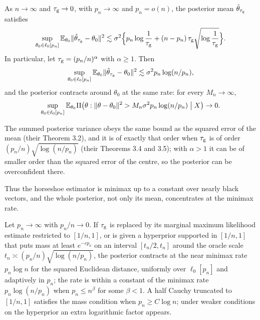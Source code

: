 \begin{theorem}\label{pg:thm:hs}
As $n\to\infty$ and $\tau_{\mathrm{g}}\to0$, with $p_n\to\infty$ and $p_n = o(n)$, the posterior mean $\hat\theta_{\tau_{\mathrm{g}}}$ satisfies
\[
\sup_{\theta_0\in\ell_0[p_n]}\mathbb{E}_{\theta_0}\lVert\hat\theta_{\tau_{\mathrm{g}}}-\theta_0\rVert^2 \lesssim \sigma^2\Bigl\{p_n\log\frac1{\tau_{\mathrm{g}}} + (n-p_n)\,\tau_{\mathrm{g}}\sqrt{\log\frac1{\tau_{\mathrm{g}}}}\Bigr\}.
\]
In particular, let $\tau_{\mathrm{g}} = (p_n/n)^\alpha$ with $\alpha\ge1$. Then
\[
\sup_{\theta_0\in\ell_0[p_n]}\mathbb{E}_{\theta_0}\lVert\hat\theta_{\tau_{\mathrm{g}}}-\theta_0\rVert^2 \lesssim \sigma^2 p_n\log(n/p_n),
\]
and the posterior contracts around $\theta_0$ at the same rate: for every $M_n\to\infty$,
\[
\sup_{\theta_0\in\ell_0[p_n]}\mathbb{E}_{\theta_0}\Pi\bigl(\theta:\lVert\theta-\theta_0\rVert^2 > M_n\sigma^2 p_n\log(n/p_n)\bigm| X\bigr)\to0 .
\]
\end{theorem}
The summed posterior variance obeys the same bound as the squared error of the mean (their Theorem 3.2), and it is of exactly that order when $\tau_{\mathrm{g}}$ is of order $(p_n/n)\sqrt{\log(n/p_n)}$ (their Theorems 3.4 and 3.5); with $\alpha>1$ it can be of smaller order than the squared error of the centre, so the posterior can be overconfident there.

Thus the horseshoe estimator is minimax up to a constant over nearly black vectors, and the whole posterior, not only its mean, concentrates at the minimax rate.

\begin{theorem}\label{pg:thm:adaptive}
Let $p_n\to\infty$ with $p_n/n\to0$. If $\tau_{\mathrm{g}}$ is replaced by its marginal maximum likelihood estimate restricted to $[1/n,1]$, or is given a hyperprior supported in $[1/n,1]$ that puts mass at least $e^{-cp_n}$ on an interval $[t_n/2,t_n]$ around the oracle scale $t_n\asymp(p_n/n)\sqrt{\log(n/p_n)}$, the posterior contracts at the near minimax rate $p_n\log n$ for the squared Euclidean distance, uniformly over $\ell_0[p_n]$ and adaptively in $p_n$; the rate is within a constant of the minimax rate $p_n\log(n/p_n)$ when $p_n\le n^\beta$ for some $\beta<1$. A half Cauchy truncated to $[1/n,1]$ satisfies the mass condition when $p_n\ge C\log n$; under weaker conditions on the hyperprior an extra logarithmic factor appears.
\end{theorem}

